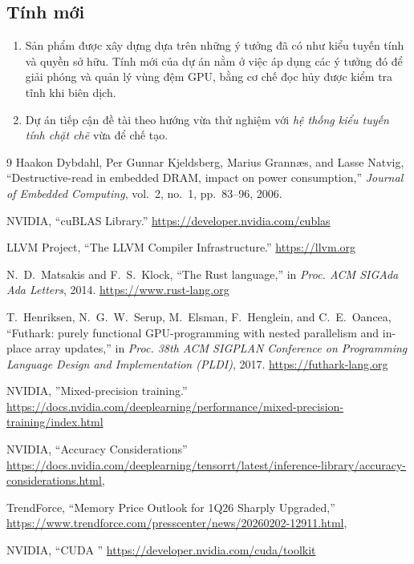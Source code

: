 \documentclass[a4paper]{article}
\begin{document}
	\subsection{Tính mới}
		\begin{enumerate}
			\item Sản phẩm được xây dựng dựa trên những ý tưởng đã có như kiểu tuyến tính và quyền sở hữu. Tính mới của dự án nằm ở việc áp dụng các ý tưởng đó để giải phóng và quản lý vùng đệm GPU, bằng cơ chế đọc hủy được kiểm tra tĩnh khi biên dịch. 
			\item Dự án tiếp cận đề tài theo hướng vừa thử nghiệm với \emph{hệ thống kiểu tuyến tính chặt chẽ} vừa để chế tạo.
		\end{enumerate}

		

	\begin{thebibliography}{9}
		Haakon Dybdahl, Per Gunnar Kjeldsberg, Marius Grann{\ae}s, and Lasse Natvig,
		``Destructive-read in embedded DRAM, impact on power consumption,''
		\emph{Journal of Embedded Computing}, vol.~2, no.~1, pp.~83--96, 2006.
		
		NVIDIA, ``cuBLAS Library.'' \url{https://developer.nvidia.com/cublas}
		
		LLVM Project, ``The LLVM Compiler Infrastructure.'' \url{https://llvm.org}

		N.~D.~Matsakis and F.~S.~Klock, ``The Rust language,'' in \emph{Proc. ACM SIGAda Ada Letters}, 2014. \url{https://www.rust-lang.org}
		
		T.~Henriksen, N.~G.~W.~Serup, M.~Elsman, F.~Henglein, and C.~E.~Oancea, ``Futhark: purely functional GPU-programming with nested parallelism and in-place array updates,'' in \emph{Proc. 38th ACM SIGPLAN Conference on Programming Language Design and Implementation (PLDI)}, 2017. \url{https://futhark-lang.org}

		NVIDIA, ''Mixed-precision training.'' \url{https://docs.nvidia.com/deeplearning/performance/mixed-precision-training/index.html}

		NVIDIA, ``Accuracy Considerations''
		\url{https://docs.nvidia.com/deeplearning/tensorrt/latest/inference-library/accuracy-considerations.html},

		TrendForce, ``Memory Price Outlook for 1Q26 Sharply Upgraded,''
		\url{https://www.trendforce.com/presscenter/news/20260202-12911.html},

		NVIDIA, ``CUDA ''
		\url{https://developer.nvidia.com/cuda/toolkit}

	\end{thebibliography}
	
\end{document}
